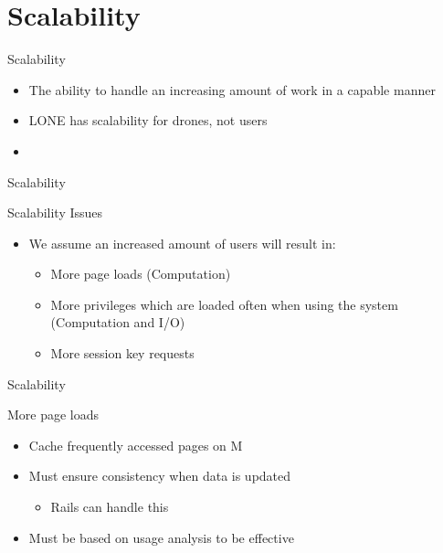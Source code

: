 \author{Esben Pilgaard Møller}

\section{Scalability}
\begin{frame}{Scalability}{}
  \begin{itemize}
  	\item The ability to handle an increasing amount of work in a capable manner
  	\item LONE has scalability for drones, not users
  	\item 
  \end{itemize}
\end{frame}


\begin{frame}{Scalability}{}
\begin{block}{Scalability Issues}
  \begin{itemize}
    \item We assume an increased amount of users will result in:
    \begin{itemize}
			\item More page loads (Computation)
			\item More privileges which are loaded often when using the system (Computation and I/O)
			\item More session key requests
		\end{itemize}
  \end{itemize}
\end{block}
\end{frame}

\begin{frame}{Scalability}{}
\begin{block}{More page loads}
  \begin{itemize}
    \item Cache frequently accessed pages on M
    \item Must ensure consistency when data is updated
    	\begin{itemize}
				\item Rails can handle this
			\end{itemize}
		\item Must be based on usage analysis to be effective
  \end{itemize}
\end{block}
\end{frame}

